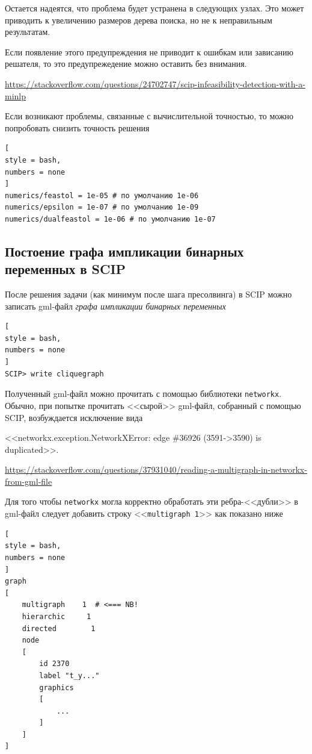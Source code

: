 \documentclass[%
	11pt,
	a4paper,
	utf8,
		]{article}
\begin{document}
Остается надеятся, что проблема будет устранена в следующих узлах. Это может приводить к увеличению размеров дерева поиска, но не к неправильным результатам.

Если появление этого предупреждения не приводит к ошибкам или зависанию решателя, то это предупрежедение можно оставить без внимания.

\noindent\url{https://stackoverflow.com/questions/24702747/scip-infeasibility-detection-with-a-minlp}

Если возникают проблемы, связанные с вычислительной точностью, то можно попробовать снизить точность решения
\begin{lstlisting}[
style = bash,
numbers = none
]
numerics/feastol = 1e-05 # по умолчанию 1e-06
numerics/epsilon = 1e-07 # по умолчанию 1e-09
numerics/dualfeastol = 1e-06 # по умолчанию 1e-07
\end{lstlisting}

\subsection{Постоение графа импликации бинарных переменных в SCIP}

После решения задачи (как минимум после шага пресолвинга) в SCIP можно записать gml-файл \emph{графа импликации бинарных переменных}
\begin{lstlisting}[
style = bash,
numbers = none
]
SCIP> write cliquegraph
\end{lstlisting}

Полученный gml-файл можно прочитать с помощью библиотеки \texttt{networkx}. Обычно, при попытке прочитать <<сырой>> gml-файл, собранный с помощью SCIP,  возбуждается исключение вида

\noindent<<networkx.exception.NetworkXError: edge \#36926 (3591->3590) is duplicated>>.

\noindent\url{https://stackoverflow.com/questions/37931040/reading-a-multigraph-in-networkx-from-gml-file}

Для того чтобы \texttt{networkx} могла корректно обработать эти ребра-<<дубли>> в gml-файл следует добавить строку <<\verb|multigraph 1|>> как показано ниже
\begin{lstlisting}[
style = bash,
numbers = none	
]
graph
[
    multigraph    1  # <=== NB!
    hierarchic     1
    directed        1
    node
    [
        id 2370
        label "t_y..."
        graphics
        [
            ...
        ]
    ]
]
\end{lstlisting}
\end{document}
